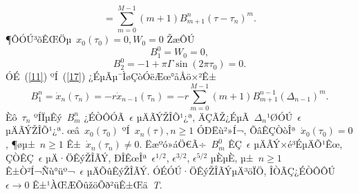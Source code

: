 \documentclass[12pt,openany,CJK,oneside]{cctbook}
\begin{document}
{\begin{equation}
  =\sum_{m=0}^{M-1} (m+1)B_{m+1}^{n}(\tau-\tau_{n})^{m}.
\end{equation}
¶ÔÓÚ³õÊŒÖµ\ $x_0(\tau_0)=0,W_0=0$ ŽæÔÚ
\begin{equation}\label{19}
 B_{1}^{0}=W_{0}=0,
\end{equation}
\begin{equation}\label{20}
  B_{2}^{0}=-1+\pi\Gamma\sin(2\pi\tau_{0})=0.
\end{equation}
ÓÉ\ (\ref{11}) ºÍ\ (\ref{17}) ¿ÉµÃµ¯ÌøÇòÓëÆœ°åÅö×²Ê±
\begin{equation}\label{21}
  B_{1}^{n}=\dot{x}_{n}(\tau_{n})=-r\dot{x}_{n-1}(\tau_{n})
  =-r\sum_{m=0}^{M-1}(m+1)B_{m+1}^{n-1}(\Delta_{n-1})^{m}.
\end{equation}
Èô\ $\tau_{n}$ ºÍÏµÊý\ $B_{m}^{n}$ ¿ÉÒÔÓÃ\ $\epsilon$ µÄÃÝŽÎÕ¹¿ª, ÄÇÃŽ¿ÉµÃ\ $\Delta_{n}$¹ØÓÚ\ $\epsilon$ µÄÃÝŽÎÕ¹¿ª. œâ\ $x_{0}(\tau_{0})$ ºÍ\ $x_{n}(\tau), n\geq1$ ÓÐËù²»Í¬, ÕâÊÇÒòÎª\ $\dot{x}_{0}(\tau_{0})=0$, ¶øµ±\ $n\geq1$ Ê±\ $\dot{x}_{n}(\tau_{n})\neq0$. Ëæºó»áÖ€Ã÷\ $B_{m}^{0}$ ÊÇ\ $\epsilon$ µÄÃÝ×é³ÉµÄÕ¹Êœ, ÇÒÊÇ\ $\epsilon$ µÄ·ÖÊýŽÎÃÝ, ÐÎÊœÎª\ $\epsilon^{1/2}$, $\epsilon^{3/2}$, $\epsilon^{5/2}$ µÈµÈ, µ±\ $n\geq1$ Ê±Ò²Í¬Ñù°üº¬\ $\epsilon$ µÄÕûÊýŽÎÃÝ. ÓÉÓÚ·ÖÊýŽÎÃÝµÄ³öÏÖ, ÎÒÃÇ¿ÉÒÔÔÚ\ $\epsilon\rightarrow0$ Ê±¹ÀŒÆÕûžöÕð²üÊ±Œä\ \emph{T}.

}
\end{document}
